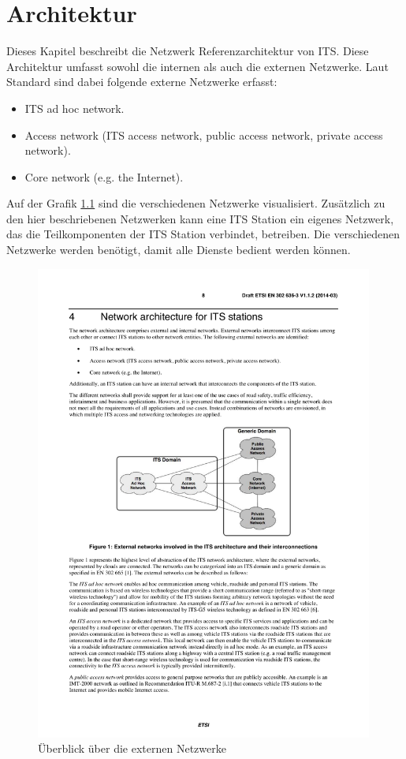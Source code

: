 \chapter{Architektur  \label{chap_archtitektur}}
Dieses Kapitel beschreibt die Netzwerk Referenzarchitektur von \ac{ITS}. Diese Architektur umfasst sowohl die internen als auch die externen Netzwerke. Laut Standard \cite{etsi302636-3} sind dabei folgende externe Netzwerke erfasst:

\begin{itemize}
 	\item ITS ad hoc network.
	\item Access network (ITS access network, public access network, private access network).
	\item Core network (e.g. the Internet).
\end{itemize}

Auf der Grafik \ref{fig:architektur_ueberblickNetzwerke} sind die verschiedenen Netzwerke visualisiert. Zusätzlich zu den hier beschriebenen Netzwerken kann eine \ac{ITS} Station ein eigenes Netzwerk, das die Teilkomponenten der \ac{ITS} Station verbindet, betreiben. Die verschiedenen Netzwerke werden benötigt, damit alle Dienste bedient werden können.

\begin{figure}[h]
	\includegraphics[width=0.99\textwidth]{content/images/02_architektur/uebersichtExterneNetzwerke.pdf}
	\caption{Überblick über die externen Netzwerke \cite{etsi302636-3}}
	\label{fig:architektur_ueberblickNetzwerke}
\end{figure}

